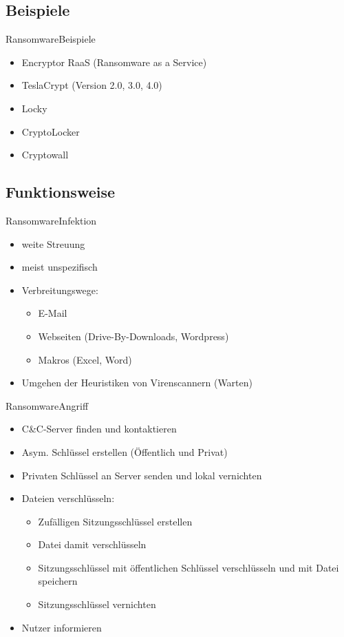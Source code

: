 \documentclass[notes,10pt]{beamer}
\begin{document}
\subsection{Beispiele}
\begin{frame}{Ransomware}{Beispiele}
	\begin{itemize}
		\item Encryptor RaaS (Ransomware as a Service)
		\item TeslaCrypt (Version 2.0, 3.0, 4.0)
		\item Locky
		\item CryptoLocker
		\item Cryptowall
	\end{itemize}
\end{frame}

\subsection{Funktionsweise}
\begin{frame}{Ransomware}{Infektion}
		\begin{itemize}
			\item weite Streuung
			\item meist unspezifisch
			\item Verbreitungswege:
				\begin{itemize}
					\item E-Mail
					\item Webseiten (Drive-By-Downloads, Wordpress)
					\item Makros (Excel, Word)
				\end{itemize}
			\item Umgehen der Heuristiken von Virenscannern (Warten)
		\end{itemize}
\end{frame}
\begin{frame}{Ransomware}{Angriff}
		\begin{itemize}
			\item C\&C-Server finden und kontaktieren 
			\item Asym. Schlüssel erstellen (Öffentlich und Privat)
			\item Privaten Schlüssel an Server senden und lokal vernichten
			\item Dateien verschlüsseln:
				\begin{itemize}
					\item Zufälligen Sitzungsschlüssel erstellen
					\item Datei damit verschlüsseln
					\item Sitzungsschlüssel mit öffentlichen Schlüssel verschlüsseln und mit Datei speichern
					\item Sitzungsschlüssel vernichten
				\end{itemize}
			\item Nutzer informieren
		\end{itemize}
\end{frame}
\end{document}
